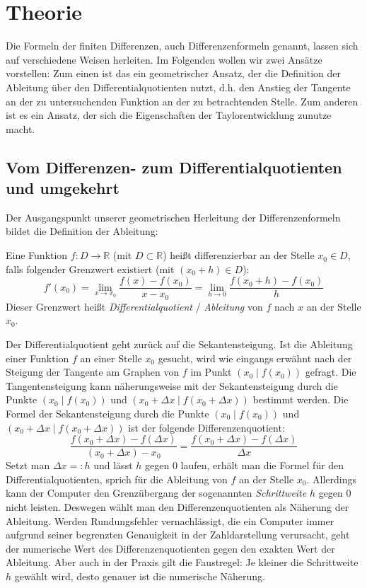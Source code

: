 \documentclass{scrartcl}
\begin{document}
\pagebreak \section{Theorie}
\label{sec:theorie}
Die Formeln der finiten Differenzen, auch Differenzenformeln genannt, lassen sich auf verschiedene Weisen herleiten. Im Folgenden wollen wir zwei Ansätze vorstellen: Zum einen ist das ein geometrischer Ansatz, der die Definition der Ableitung über den Differentialquotienten nutzt, d.h. den Anstieg der Tangente an der zu untersuchenden Funktion an der zu betrachtenden Stelle. Zum anderen ist es ein Ansatz, der sich die Eigenschaften der Taylorentwicklung zunutze macht.

\subsection{Vom Differenzen- zum Differentialquotienten und umgekehrt}
\label{ssec:herleitung1}
Der Ausgangspunkt unserer geometrischen Herleitung der Differenzenformeln bildet die Definition der Ableitung:
\begin{shaded}
Eine Funktion $f:D \rightarrow \mathbb{R}$ (mit $D\subset \mathbb{R}$) heißt differenzierbar an der Stelle $x_0 \in D$, falls folgender Grenzwert existiert (mit $(x_0+h) \in D$): \[f'(x_0) = \lim _{x\to x_0} {\frac {f(x)-f(x_0)}{x-x_0}} = \lim _{h\to 0} {\frac {f(x_0+h)-f(x_0)}{h}}\] Dieser Grenzwert heißt \textit{Differentialquotient} / \textit{Ableitung} von $f$ nach $x$ an der Stelle $x_0$.
\end{shaded}
Der Differentialquotient geht zurück auf die Sekantensteigung. Ist die Ableitung einer Funktion $f$ an einer Stelle $x_0$ gesucht, wird wie eingangs erwähnt nach der Steigung der Tangente am Graphen von $f$ im Punkt $(x_0 \mid f(x_0))$ gefragt. Die Tangentensteigung kann näherungsweise mit der Sekantensteigung durch die Punkte $(x_0 \mid f(x_0))$ und $(x_0 + \Delta x \mid f(x_0 + \Delta x))$ bestimmt werden. Die Formel der Sekantensteigung durch die Punkte $(x_0 \mid f(x_0))$ und $(x_0 + \Delta x \mid f(x_0 + \Delta x))$ ist der folgende Differenzenquotient: \[\frac {f(x_0 + \Delta x)-f(\Delta x)}{(x_0 + \Delta x) - x_0} = \frac {f(x_0 + \Delta x)-f(\Delta x)}{\Delta x}\]
Setzt man $\Delta x =: h$ und lässt $h$ gegen $0$ laufen, erhält man die Formel für den Differentialquotienten, sprich für die Ableitung von $f$ an der Stelle $x_0$. Allerdings kann der Computer den Grenzübergang der sogenannten \textit{Schrittweite} $h$ gegen $0$ nicht leisten. Deswegen wählt man den Differenzenquotienten als Näherung der Ableitung. Werden Rundungsfehler vernachlässigt, die ein Computer immer aufgrund seiner begrenzten Genauigkeit in der Zahldarstellung verursacht, geht der numerische Wert des Differenzenquotienten gegen den exakten Wert der Ableitung. Aber auch in der Praxis gilt die Faustregel: Je kleiner die Schrittweite $h$ gewählt wird, desto genauer ist die numerische Näherung. \\
\end{document}
